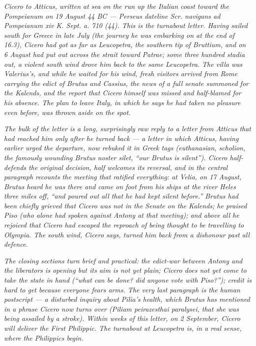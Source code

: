 
\textit{Cicero to Atticus, written at sea on the run up the
Italian coast toward the Pompeianum on 19 August 44 BC ---
Perseus dateline \textit{Scr. navigans ad Pompeianum xiv K.
Sept. a. 710 (44)}. This is the turnabout letter. Having
sailed south for Greece in late July (the journey he was
embarking on at the end of 16.3), Cicero had got as far as
Leucopetra, the southern tip of Bruttium, and on 6 August had
put out across the strait toward Patrae; some three hundred
stadia out, a violent south wind drove him back to the same
Leucopetra. The villa was Valerius's, and while he waited for
his wind, fresh visitors arrived from Rome carrying the
edict of Brutus and Cassius, the news of a full senate
summoned for the Kalends, and the report that Cicero himself
was missed and half-blamed for his absence. The plan to leave
Italy, in which he says he had taken no pleasure even before,
was thrown aside on the spot.}

\textit{The bulk of the letter is a long, surprisingly raw
reply to a letter from Atticus that had reached him only
after he turned back --- a letter in which Atticus, having
earlier urged the departure, now rebuked it in Greek tags
(\textit{euthanasian}, \textit{scholion}, the famously
wounding \textit{Brutus noster silet}, ``our Brutus is
silent''). Cicero half-defends the original decision, half
welcomes its reversal, and in the central paragraph
recounts the meeting that ratified everything: at Velia, on
17 August, Brutus heard he was there and came on foot from
his ships at the river Heles three miles off, ``and poured
out all that he had kept silent before.'' Brutus had been
chiefly grieved that Cicero was not in the Senate on the
Kalends; he praised Piso (who alone had spoken against
Antony at that meeting); and above all he rejoiced that
Cicero had escaped the reproach of being thought to be
travelling to Olympia. The south wind, Cicero says, turned
him back from a dishonour past all defence.}

\textit{The closing sections turn brief and practical: the
edict-war between Antony and the liberators is opening but
its aim is not yet plain; Cicero does not yet come to take
the state in hand (``what can be done? did anyone vote with
Piso?''); credit is hard to get because everyone fears arms.
The very last paragraph is the human postscript --- a
disturbed inquiry about Pilia's health, which Brutus has
mentioned in a phrase Cicero now turns over (\textit{Piliam
peirazesthai paralysei}, that she was being assailed by a
stroke). Within weeks of this letter, on 2 September, Cicero
will deliver the First Philippic. The turnabout at Leucopetra
is, in a real sense, where the Philippics begin.}
